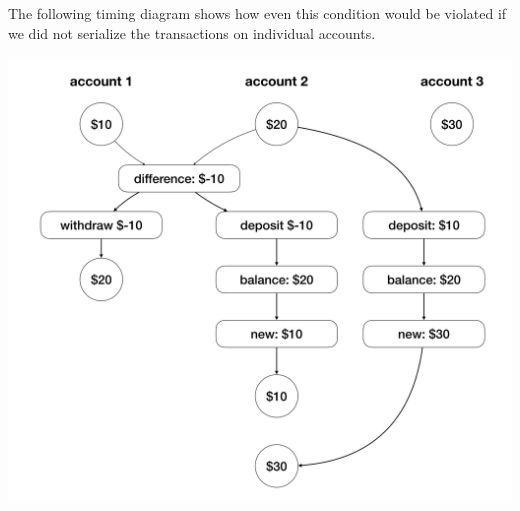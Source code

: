 \documentclass[11pt, oneside]{article}
\begin{document}
The following timing diagram shows how even this condition would be violated if we did not serialize the transactions on individual accounts.

\begin{center}
    \includegraphics[width=.7\textwidth,height=.7\textheight,keepaspectratio]{2.png}
\end{center}
\end{document}
